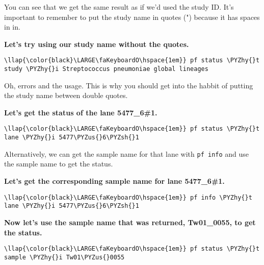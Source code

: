 \documentclass[11pt]{article}
\def\PYZus{\char`\_}
\def\PYZsh{\char`\#}
\def\PYZhy{\char`\-}
\begin{document}
    You can see that we get the same result as if we'd used the study ID.
It's important to remember to put the study name in quotes (") because
it has spaces in in.

\textbf{Let's try using our study name without the quotes.}

\begin{terminalinput}
\begin{Verbatim}[commandchars=\\\{\}]
\llap{\color{black}\LARGE\faKeyboardO\hspace{1em}} pf status \PYZhy{}t study \PYZhy{}i Streptococcus pneumoniae global lineages
\end{Verbatim}
\end{terminalinput}

    Oh, errors and the usage. This is why you should get into the habbit of
putting the study name between double quotes.

\textbf{Let's get the status of the lane 5477\_6\#1.}

\begin{terminalinput}
\begin{Verbatim}[commandchars=\\\{\}]
\llap{\color{black}\LARGE\faKeyboardO\hspace{1em}} pf status \PYZhy{}t lane \PYZhy{}i 5477\PYZus{}6\PYZsh{}1
\end{Verbatim}
\end{terminalinput}

    Alternatively, we can get the sample name for that lane with
\texttt{pf\ info} and use the sample name to get the status.

\textbf{Let's get the corresponding sample name for lane 5477\_6\#1.}

\begin{terminalinput}
\begin{Verbatim}[commandchars=\\\{\}]
\llap{\color{black}\LARGE\faKeyboardO\hspace{1em}} pf info \PYZhy{}t lane \PYZhy{}i 5477\PYZus{}6\PYZsh{}1
\end{Verbatim}
\end{terminalinput}

    \textbf{Now let's use the sample name that was returned, Tw01\_0055, to
get the status.}

\begin{terminalinput}
\begin{Verbatim}[commandchars=\\\{\}]
\llap{\color{black}\LARGE\faKeyboardO\hspace{1em}} pf status \PYZhy{}t sample \PYZhy{}i Tw01\PYZus{}0055
\end{Verbatim}
\end{terminalinput}
\end{document}
